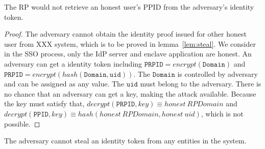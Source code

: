 \begin{lemma}
The RP would not retrieve an honest user's PPID from the adversary's identity token.
\label{lem:trickRP}
\end{lemma}

\begin{proof}
The adversary cannot obtain the identity proof issued for other honest user from XXX system, which is to be proved in lemma~\ref{lem:steal}. We consider in the SSO process, only the IdP server and enclave application are honest. An adversary can get a identity token including $\mathtt{PRPID}=encrypt(\mathtt{Domain})$ and $\mathtt{PRPID}=encrypt(hash(\mathtt{Domain}, \mathtt{uid}))$. The $\mathtt{Domain}$ is controlled by adversary and can be assigned as any value. The $\mathtt{uid}$ must belong to the adversary. There is no chance that an adversary can get a key, making the attack available. Because the key must satisfy that, $decrypt(\mathtt{PRPID}, key) \equiv honest\ RPDomain$ and  $decrypt(\mathtt{PPID}, key) \equiv hash(honest\ RPDomain, honest\ uid)$, which is not possible.   
\end{proof}


\begin{lemma}
The adversary cannot steal an identity token from any entities in the system.
\label{lem:steal}
\end{lemma}

